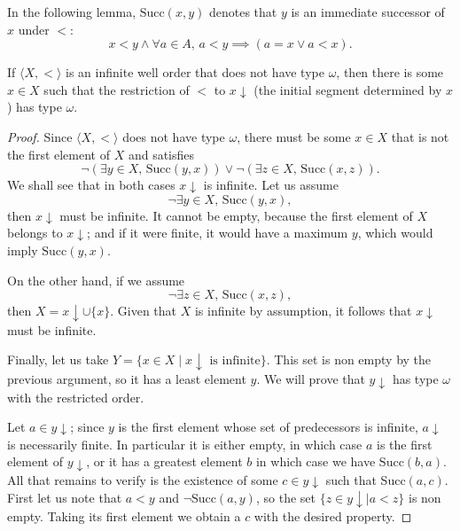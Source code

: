 In the following lemma, $\text{Succ}(x,y)$ denotes that $y$ is an immediate
successor of $x$ under $<$: 
\[
  x<y \land \forall a\in A,\, a < y \implies (a=x \lor a < x).
\] 
\begin{lemma}\label{lem:omega-segment}
  If $\langle X,< \rangle$ is an infinite well order that does not have type
  $\omega$, then there is some $x\in X$ such that the restriction of $<$ to
  $x{\downarrow}$ (the initial segment determined by $x$) has type $\omega$.
\end{lemma}
\begin{proof}
	Since $\langle X,< \rangle$ does not have type $\omega$, there must be some $x\in X$ that is not the first element of $X$ and satisfies
	\[
	\neg(\exists y\in X,\, \text{Succ}(y,x)) \lor \neg (\exists z\in X,\, \text{Succ}(x,z)).
	\]
	We shall see that in both cases $x{\downarrow}$ is infinite. Let us assume 
	\[
	\neg\exists y\in X,\, \text{Succ}(y,x),
	\]
	then $x{\downarrow}$ must be infinite. It cannot be empty, because the first element of $X$ belongs to $x{\downarrow}$; and if it were finite, it would have a maximum $y$, which would imply $\text{Succ}(y,x)$.
	
	On the other hand, if we assume
	\[
	\neg \exists z\in X,\, \text{Succ}(x,z),
	\]
	then $X = x{\downarrow} \cup \{x\}$. Given that $X$ is infinite by assumption, it follows that $x{\downarrow}$ must be infinite.
	
	Finally, let us take $Y = \{x\in X \mid x{\downarrow} \text{ is infinite}\}$. This set is non empty by the previous argument, so it has a least element $y$. We will prove that $y{\downarrow}$ has type $\omega$ with the restricted order.

	Let $a\in y{\downarrow}$; since $y$ is the first element whose set of
        predecessors is infinite, $a{\downarrow}$ is necessarily finite. In
        particular it is either empty, in which case $a$ is the first element of
        $y{\downarrow}$, or it has a greatest element $b$ in which case we have $\text{Succ}(b,a)$. All that remains to verify is the existence of some $c\in y{\downarrow}$ such that Succ$(a,c)$.
	First let us note that $a<y$ and $\neg\text{Succ}(a,y)$, so the set $\{z\in y{\downarrow} \mid a<z\}$ is non empty. Taking its first element we obtain a $c$ with the desired property.
\end{proof}

